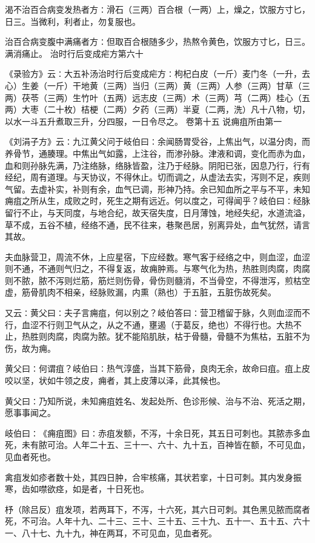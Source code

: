 \documentclass[a4paper,12pt,UTF8,twoside]{ctexbook}
\begin{document}
渴不治百合病变发热者方∶滑石（三两）百合根（一两）上，燥之，饮服方寸匕，日三。当微利，利者止，勿复服也。

治百合病变腹中满痛者方∶但取百合根随多少，热熬令黄色，饮服方寸匕，日三。满消痛止。
治时行后变成疟方第六十

《录验方》云∶大五补汤治时行后变成疟方∶枸杞白皮（一斤）麦门冬（一升，去心）生姜（一斤）干地黄（三两）当归（三两）黄（三两）人参（三两）甘草（三两）茯苓（三两）生竹叶（五两）远志皮（三两）术（三两）芎（二两）桂心（五两）大枣（二十枚）桔梗（二两）夕药（三两）半夏（二两，洗）凡十八物，切，以水一斗五升煮取三升，分四服，一日令尽之。
卷第十五
说痈疽所由第一

《刘涓子方》云∶九江黄父问于岐伯曰∶余闻肠胃受谷，上焦出气，以温分肉，而养骨节，通腠理。中焦出气如露，上注谷，而渗孙脉。津液和调，变化而赤为血，血和则孙脉先满，乃注络脉，络脉皆盈，注乃于经脉。阴阳已张，因息乃行，行有经纪，周有道理。与天协议，不得休止。切而调之，从虚法去实，泻则不足，疾则气留。去虚补实，补则有余，血气已调，形神乃持。余已知血所之平与不平，未知痈疽之所从生，成败之时，死生之期有远近。何以度之，可得闻乎？岐伯曰∶经脉留行不止，与天同度，与地合纪，故天宿失度，日月薄蚀，地经失纪，水道流溢，草不成，五谷不植，经络不通，民不往来，巷聚邑居，别离异处，血气犹然，请言其故。

夫血脉营卫，周流不休，上应星宿，下应经数。寒气客于经络之中，则血涩，血涩则不通，不通则气归之，不得复返，故痈肿焉。与寒气化为热，热胜则肉腐，肉腐则不脓，脓不泻则烂筋，筋烂则伤骨，骨伤则髓消，不当骨空，不得泄泻，煎枯空虚，筋骨肌肉不相亲，经脉败漏，内熏（熟也）于五脏，五脏伤故死矣。

又云∶黄父曰∶夫子言痈疽，何以别之？岐伯答曰∶营卫稽留于脉，久则血涩而不行，血涩不行则卫气从之，从之不通，壅遏（于葛反，绝也）不得行也。大热不止，热胜则肉腐，肉腐为脓。犹不能陷肌肤，枯于骨髓，骨髓不为焦枯，五脏不为伤，故为痈。

黄父曰∶何谓疽？岐伯曰∶热气淳盛，当其下筋骨，良肉无余，故命曰疽。疽上皮咬以坚，状如牛领之皮，痈者，其上皮薄以泽，此其候也。

黄父曰∶乃知所说，未知痈疽姓名、发起处所、色诊形候、治与不治、死活之期，愿事事闻之。

岐伯曰∶《痈疽图》曰∶赤疽发额，不泻，十余日死，其五日可刺也。其脓赤多血死，未有脓可治。人年二十五、三十一、六十、九十五，百神皆在额，不可见血，见血者死也。

禽疽发如疹者数十处，其四日肿，合牢核痛，其状若挛，十日可刺。其内发身振寒，齿如噤欲痉，如是者，十日死也。

杼（除吕反）疽发项，若两耳下，不泻，十六死，其六日可刺。其色黑见脓而腐者死，不可治。人年十九、二十三、三十、三十五、三十九、五十一、五十五、六十一、八十七、九十九，神在两耳，不可见血，见血者死。
\end{document}
